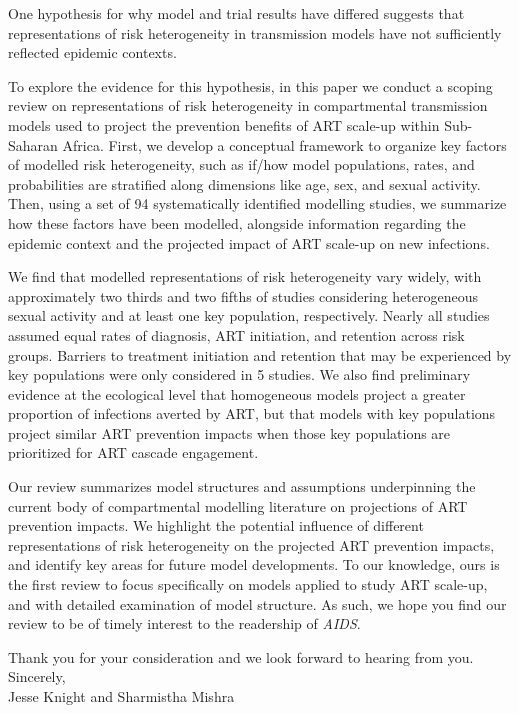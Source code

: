 \documentclass{article}
\begin{document}
One hypothesis for why model and trial results have differed suggests that
representations of risk heterogeneity in transmission models
have not sufficiently reflected epidemic contexts.
\par
To explore the evidence for this hypothesis, in this paper we conduct a scoping review on
representations of risk heterogeneity in compartmental transmission models
used to project the prevention benefits of ART scale-up within Sub-Saharan Africa.
First, we develop a conceptual framework to organize key factors of modelled risk heterogeneity,
such as if/how model populations, rates, and probabilities
are stratified along dimensions like age, sex, and sexual activity.
Then, using a set of 94 systematically identified modelling studies,
we summarize how these factors have been modelled, alongside information regarding
the epidemic context and the projected impact of ART scale-up on new infections.
\par
We find that modelled representations of risk heterogeneity vary widely,
with approximately two thirds and two fifths of studies considering
heterogeneous sexual activity and at least one key population, respectively.
Nearly all studies assumed equal rates of
diagnosis, ART initiation, and retention across risk groups.
Barriers to treatment initiation and retention that may be experienced by key populations
were only considered in 5 studies.
We also find preliminary evidence at the ecological level that
homogeneous models project a greater proportion of infections averted by ART,
but that models with key populations project similar ART prevention impacts
when those key populations are prioritized for ART cascade engagement.
\par
Our review summarizes model structures and assumptions underpinning
the current body of compartmental modelling literature on projections of ART prevention impacts.
We highlight the potential influence of different representations of risk heterogeneity
on the projected ART prevention impacts,
and identify key areas for future model developments.
To our knowledge, ours is the first review to focus specifically on
models applied to study ART scale-up,
and with detailed examination of model structure.
As such, we hope you find our review to be of timely interest
to the readership of \textit{AIDS}.
\par
Thank you for your consideration and we look forward to hearing from you.
\\[2em]
Sincerely,\\[1em]
Jesse Knight and Sharmistha Mishra
\end{document}
